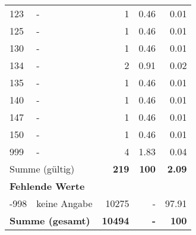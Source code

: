 \begin{longtable}{lXrrr}
        123 & \multicolumn{1}{X}{-} & %
          \num{1} &
          \num[round-mode=places,round-precision=2]{0.46} &
          \num[round-mode=places,round-precision=2]{0.01} \\

        125 & \multicolumn{1}{X}{-} & %
          \num{1} &
          \num[round-mode=places,round-precision=2]{0.46} &
          \num[round-mode=places,round-precision=2]{0.01} \\

        130 & \multicolumn{1}{X}{-} & %
          \num{1} &
          \num[round-mode=places,round-precision=2]{0.46} &
          \num[round-mode=places,round-precision=2]{0.01} \\

        134 & \multicolumn{1}{X}{-} & %
          \num{2} &
          \num[round-mode=places,round-precision=2]{0.91} &
          \num[round-mode=places,round-precision=2]{0.02} \\

        135 & \multicolumn{1}{X}{-} & %
          \num{1} &
          \num[round-mode=places,round-precision=2]{0.46} &
          \num[round-mode=places,round-precision=2]{0.01} \\

        140 & \multicolumn{1}{X}{-} & %
          \num{1} &
          \num[round-mode=places,round-precision=2]{0.46} &
          \num[round-mode=places,round-precision=2]{0.01} \\

        147 & \multicolumn{1}{X}{-} & %
          \num{1} &
          \num[round-mode=places,round-precision=2]{0.46} &
          \num[round-mode=places,round-precision=2]{0.01} \\

        150 & \multicolumn{1}{X}{-} & %
          \num{1} &
          \num[round-mode=places,round-precision=2]{0.46} &
          \num[round-mode=places,round-precision=2]{0.01} \\

        999 & \multicolumn{1}{X}{-} & %
          \num{4} &
          \num[round-mode=places,round-precision=2]{1.83} &
          \num[round-mode=places,round-precision=2]{0.04} \\

     \midrule
     \multicolumn{2}{l}{Summe (gültig)} &
       \textbf{\num{219}} &
     \textbf{\num{100}} &
       \textbf{\num[round-mode=places,round-precision=2]{2.09}} \\
     \multicolumn{5}{l}{\textbf{Fehlende Werte}}\\
       -998 &
       keine Angabe &
         \num{10275} &
        - &
         \num[round-mode=places,round-precision=2]{97.91} \\
     \midrule
     \multicolumn{2}{l}{\textbf{Summe (gesamt)}} &
          \textbf{\num{10494}} &
        \textbf{-} &
        \textbf{\num{100}} \\
     \bottomrule
     \end{longtable}
     
